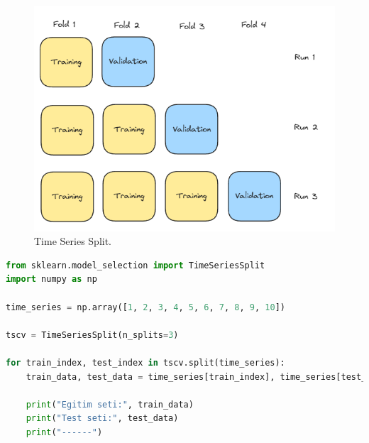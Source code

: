 \begin{figure}[h]
    \centering
    \includegraphics[width=1\textwidth]{images/time_series_split_structure.png}
    \caption{Time Series Split.}
    \label{fig:enter-label}
\end{figure}

\begin{lstlisting}[language=Python, caption=Scikit-learn'de Time Series Split örneği.]
from sklearn.model_selection import TimeSeriesSplit
import numpy as np

time_series = np.array([1, 2, 3, 4, 5, 6, 7, 8, 9, 10])

tscv = TimeSeriesSplit(n_splits=3)

for train_index, test_index in tscv.split(time_series):
    train_data, test_data = time_series[train_index], time_series[test_index]
    
    print("Egitim seti:", train_data)
    print("Test seti:", test_data)
    print("------")
\end{lstlisting}

\newpage